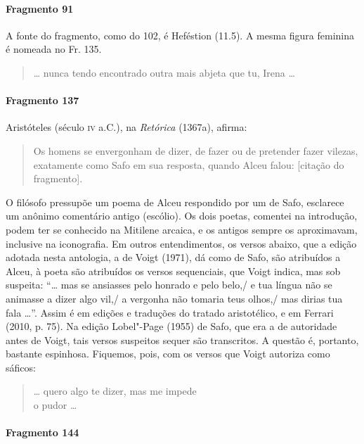 {\paragraph{Fragmento 91}

{\small A fonte do fragmento, como do 102, é Heféstion (11.5).
A mesma figura feminina é nomeada no Fr. 135.}

\begin{verse}
\ldots{} nunca tendo encontrado outra mais abjeta que \qb{}tu, Irena \ldots{}
\end{verse}

\paragraph{Fragmento 137}

{\small Aristóteles (século \textsc{iv} a.C.), na \textit{Retórica} (1367a), afirma: 

\begin{quote}
Os homens se envergonham de dizer, de fazer ou de pretender fazer vilezas, exatamente
como Safo em sua resposta, quando Alceu falou: [citação do fragmento].
\end{quote}

O filósofo pressupõe um poema de Alceu respondido por um de Safo, esclarece um anônimo comentário antigo (escólio). Os
dois poetas, comentei na introdução, podem ter se conhecido na Mitilene arcaica, e
os antigos sempre os aproximavam, inclusive na iconografia.
Em outros entendimentos, os versos abaixo, que a edição adotada nesta antologia, a de Voigt (1971), dá como de Safo, são atribuídos a Alceu, à poeta são atribuídos os versos sequenciais, que Voigt indica, mas sob suspeita: ``\ldots{} mas se ansiasses pelo honrado e pelo belo,/ e tua língua não se animasse a dizer algo vil,/ a vergonha não tomaria teus olhos,/ mas dirias tua fala \ldots{}''. Assim é em edições e traduções do tratado aristotélico, e em Ferrari (2010, p. 75). Na edição Lobel"-Page (1955) de Safo, que era a de autoridade antes de Voigt, tais versos suspeitos sequer são transcritos. A questão é, portanto, bastante espinhosa. Fiquemos, pois, com os versos que Voigt autoriza como sáficos:}

\begin{verse}
\ldots{} quero algo te dizer, mas me impede\\
o pudor \ldots{}
\end{verse}

\paragraph{Fragmento 144}

}
